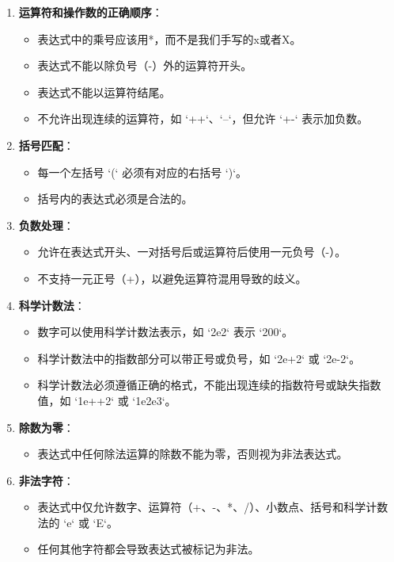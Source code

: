 \documentclass{article}
\begin{document}
\begin{enumerate}
    \item \textbf{运算符和操作数的正确顺序}：
    \begin{itemize}
        \item 表达式中的乘号应该用*，而不是我们手写的x或者X。
        \item 表达式不能以除负号（-）外的运算符开头。
        \item 表达式不能以运算符结尾。
        \item 不允许出现连续的运算符，如 `++`、`--`，但允许 `+-` 表示加负数。
    \end{itemize}

    \item \textbf{括号匹配}：
    \begin{itemize}
        \item 每一个左括号 `(` 必须有对应的右括号 `)`。
        \item 括号内的表达式必须是合法的。
    \end{itemize}

    \item \textbf{负数处理}：
    \begin{itemize}
        \item 允许在表达式开头、一对括号后或运算符后使用一元负号（-）。
        \item 不支持一元正号（+），以避免运算符混用导致的歧义。
    \end{itemize}

    \item \textbf{科学计数法}：
    \begin{itemize}
        \item 数字可以使用科学计数法表示，如 `2e2` 表示 `200`。
        \item 科学计数法中的指数部分可以带正号或负号，如 `2e+2` 或 `2e-2`。
        \item 科学计数法必须遵循正确的格式，不能出现连续的指数符号或缺失指数值，如 `1e++2` 或 `1e2e3`。
    \end{itemize}

    \item \textbf{除数为零}：
    \begin{itemize}
        \item 表达式中任何除法运算的除数不能为零，否则视为非法表达式。
    \end{itemize}

    \item \textbf{非法字符}：
    \begin{itemize}
        \item 表达式中仅允许数字、运算符（+、-、*、/）、小数点、括号和科学计数法的 `e` 或 `E`。
        \item 任何其他字符都会导致表达式被标记为非法。
    \end{itemize}
\end{enumerate}
\end{document}
